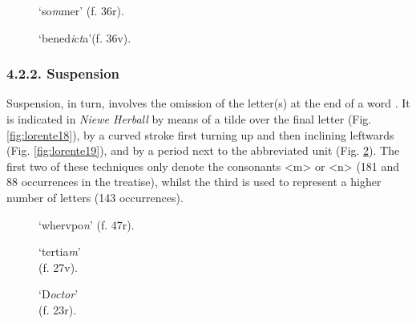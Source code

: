 \begin{paper}
\begin{figure}[H]
  \centering
  \begin{minipage}[b]{0.36\textwidth}
    \caption{`so\emph{m}mer' (f. 36r).}
    \label{fig:lorente16}
  \end{minipage}
  \hfill
  \begin{minipage}[b]{0.37\textwidth}
    \caption{`bened\emph{i}c\emph{t}a'(f. 36v).}
    \label{fig:lorente17}
  \end{minipage}
\end{figure}

\subsubsection{4.2.2. Suspension}

Suspension, in turn, involves the omission of the letter(s) at the end
of a word \citep[124]{tannenbaum_handwriting_1930}. It is indicated in \emph{Niewe
Herball} by means of a tilde over the final letter (Fig. \ref{fig:lorente18}), by a
curved stroke first turning up and then inclining leftwards (Fig. \ref{fig:lorente19}),
and by a period next to the abbreviated unit (Fig. \ref{fig:lorente20}). The first two
of these techniques only denote the consonants \textless m\textgreater{}
or \textless n\textgreater{} (181 and 88 occurrences in the treatise),
whilst the third is used to represent a higher number of letters (143
occurrences).

\begin{figure}[H]
  \centering
  \begin{minipage}[b]{0.28\textwidth}
    \caption{`whervpo\emph{n}' (f. 47r).}
    \label{fig:lorente18}
  \end{minipage}
  \hfill
  \begin{minipage}[b]{0.28\textwidth}
    \caption{`tertia\emph{m}' \\ (f. 27v).}
    \label{fig:lorente19}
  \end{minipage}
   \hfill
  \begin{minipage}[b]{0.27\textwidth}
    \caption{`D\emph{octor}' \\  (f. 23r).}
    \label{fig:lorente20}
  \end{minipage}
\end{figure}


\end{paper}
